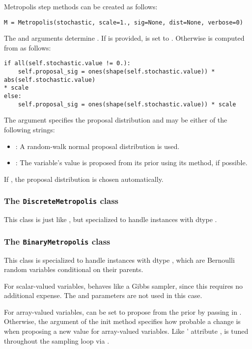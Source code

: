 Metropolis step methods can be created as follows:
\begin{verbatim}
M = Metropolis(stochastic, scale=1., sig=None, dist=None, verbose=0)
\end{verbatim}
The  and  arguments determine . If  is provided,  is set to . Otherwise  is computed from  as follows:
\begin{verbatim}
if all(self.stochastic.value != 0.):
    self.proposal_sig = ones(shape(self.stochastic.value)) * abs(self.stochastic.value) 
* scale
else:
    self.proposal_sig = ones(shape(self.stochastic.value)) * scale
\end{verbatim}

The  argument specifies the proposal distribution and may be either of the following strings:
\begin{itemize}
    \item {}: A random-walk normal proposal distribution is used.
    \item {}: The variable's value is proposed from its prior using its  method, if possible.
\end{itemize}
If , the proposal distribution is chosen automatically.

\subsubsection{The \texttt{DiscreteMetropolis} class}
This class is just like , but specialized to handle  instances with dtype .

\subsubsection{The \texttt{BinaryMetropolis} class} 
This class is specialized to handle  instances with dtype , which are Bernoulli random variables conditional on their parents. 

For scalar-valued variables,  behaves like a Gibbs sampler, since this requires no additional expense. The  and  parameters are not used in this case.

For array-valued variables,  can be set to propose from the prior by passing in . Otherwise, the argument  of the init method specifies how probable a change is when proposing a new value for array-valued variables. Like ' attribute ,  is tuned throughout the sampling loop via .

